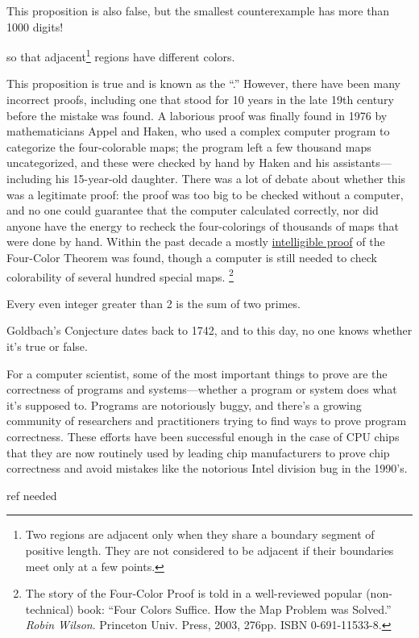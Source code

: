This proposition is also false, but the smallest counterexample has
more than 1000 digits!

\begin{proposition}\label{4colorprop}
 so that
adjacent\footnote{Two regions are adjacent only when they share a boundary
segment of positive length.  They are not considered to be adjacent if
their boundaries meet only at a few points.} regions have different
colors.
\end{proposition}

This proposition is true and is known as the ``.''  However, there have been many incorrect proofs, including
one that stood for 10 years in the late 19th century before the mistake
was found.  A laborious proof was finally found in 1976 by mathematicians
Appel and Haken, who used a complex computer program to categorize the
four-colorable maps; the program left a few thousand maps uncategorized,
and these were checked by hand by Haken and his assistants---including his
15-year-old daughter.  There was a lot of debate about whether this was a
legitimate proof: the proof was too big to be checked without a computer,
and no one could guarantee that the computer calculated correctly, nor did
anyone have the energy to recheck the four-colorings of thousands of maps
that were done by hand.  Within the past decade a mostly
\href{http://www.math.gatech.edu/~thomas/FC/fourcolor.html}{intelligible
  proof} of the Four-Color Theorem was found, though a computer is still
needed to check colorability of several hundred special maps.
\footnote{The story of the Four-Color Proof is told in a well-reviewed
  popular (non-technical) book: ``Four Colors Suffice.  How the Map
  Problem was Solved.'' \emph{Robin Wilson}.  Princeton Univ. Press, 2003,
  276pp. ISBN 0-691-11533-8.}

\begin{proposition}\label{Goldbach}
Every even integer greater than 2 is the sum of two primes.
\end{proposition}

Goldbach's Conjecture dates back to 1742, and to this day, 
no one knows whether it's true or false.

For a computer scientist, some of the most important things to prove are
the correctness of programs and systems---whether a program or system
does what it's supposed to.  Programs are notoriously buggy, and there's a
growing community of researchers and practitioners trying to find ways to
prove program correctness.  These efforts have been successful enough in
the case of CPU chips that they are now routinely used by leading chip
manufacturers to prove chip correctness and avoid mistakes like the
notorious Intel division bug in the 1990's.
\begin{editingnotes}
ref needed
\end{editingnotes}

